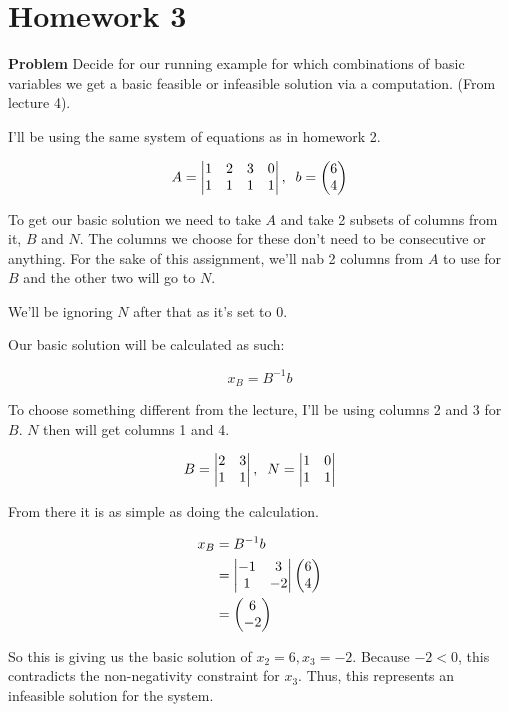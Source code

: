 \section*{Homework 3}

\textbf{Problem} Decide for our running example for which combinations of basic variables we get a basic feasible or infeasible solution via a computation. (From lecture 4).

I'll be using the same system of equations as in homework 2.

\[
	A = \m{v}{1&2&3&0 \\ 1&1&1&1}, \;\; b = \m{p}{6\\4}
\]

To get our basic solution we need to take $A$ and take 2 subsets of columns from it, $B$ and $N$. The columns we choose for these don't need to be consecutive or anything. For the sake of this assignment, we'll nab 2 columns from $A$ to use for $B$ and the other two will go to $N$. 

We'll be ignoring $N$ after that as it's set to 0. 

Our basic solution will be calculated as such:

\[
	x_B = B^{-1}b
\]

To choose something different from the lecture, I'll be using columns 2 and 3 for $B$. $N$ then will get columns 1 and 4.

\[
	B = \m{v}{2&3\\1&1}, \;\; N = \m{v}{1&0\\1&1}
\]

From there it is as simple as doing the calculation.

\begin{align}
	x_B &= B^{-1}b \\
	&= \m{v}{-1&3\\1&-2} \m{p}{6\\4} \\
	&= \m{p}{6\\-2} \\
\end{align}

So this is giving us the basic solution of $x_2 = 6, x_3 = -2$. Because $-2 < 0$, this contradicts the non-negativity constraint for $x_3$. Thus, this represents an infeasible solution for the system.
